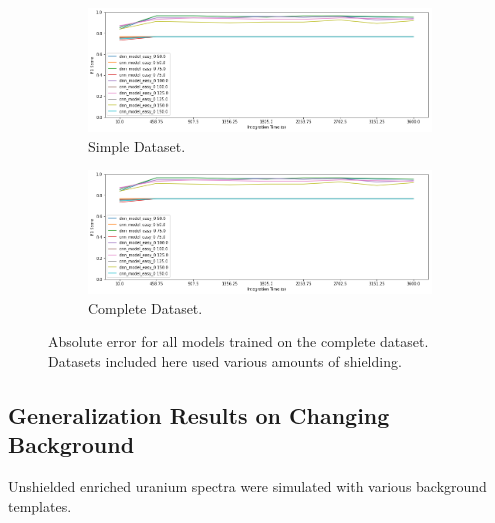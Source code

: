 \begin{figure}[H]
     \centering
     \begin{subfigure}[b]{0.9\textwidth}
         \centering
         \includegraphics[width=\textwidth]{images/results_easy_distance_comparison}
         \caption{Simple Dataset.}
         \label{fig:results_full_background_inject_simple}
     \end{subfigure}

     \begin{subfigure}[b]{0.9\textwidth}
         \centering
         \includegraphics[width=\textwidth]{images/results_easy_distance_comparison}
         \caption{Complete Dataset.}
         \label{fig:results_full_background_inject_full}
     \end{subfigure}
        \caption{Absolute error for all models trained on the complete dataset. Datasets included here used various amounts of shielding.}
        \label{fig:results_full_background_inject}
\end{figure}


\subsection{Generalization Results on Changing Background}

Unshielded enriched uranium spectra were simulated with various background templates.  


